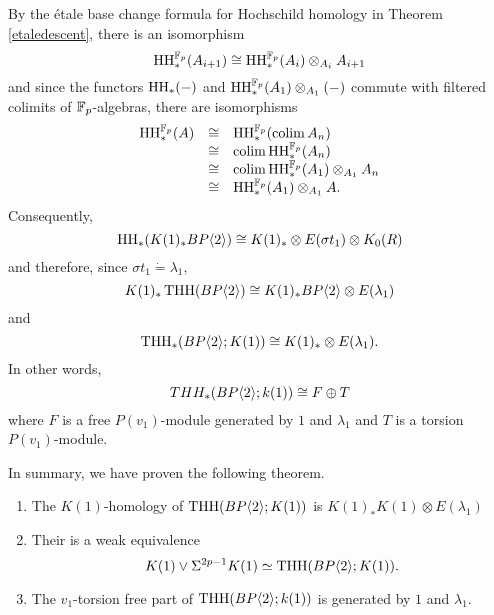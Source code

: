 By the \'etale base change formula for Hochschild homology in Theorem \ref{etaledescent}, there is an isomorphism 
\[ \operatorname{HH}_*^{\mathbb{F}_p}(A_{i+1})\cong \operatorname{HH}_*^{\mathbb{F}_p}(A_i)\otimes_{A_i}A_{i+1}\]
and since the functors $\operatorname{HH}_*(-)$ and $ \operatorname{HH}_*^{\mathbb{F}_p}(A_1)\otimes_{A_1}(-)$ commute with filtered colimits of $\mathbb{F}_p$-algebras, there are isomorphisms 
	\[ 
	\begin{array}{rcl} 
		\operatorname{HH}_*^{\mathbb{F}_p}(A) & \cong &\operatorname{HH}_*^{\mathbb{F}_p}(\operatorname*{colim} A_n) \\
				         & \cong & \operatorname*{colim}  \operatorname{HH}_*^{\mathbb{F}_p}(A_n) \\
				         & \cong & \operatorname*{colim} \operatorname{HH}_*^{\mathbb{F}_p}(A_1)\otimes_{A_1}A_n \\
				         & \cong & \operatorname{HH}_*^{\mathbb{F}_p}(A_1)\otimes_{A_1}A. \\
	\end{array}
	\]
Consequently,
\[ \operatorname{HH}_*(K(1)_*BP\langle 2 \rangle)\cong K(1)_*\otimes E(\sigma t_1)\otimes K_0(R) \]
and therefore, since $\sigma t_1\dot{=}\lambda_1$, 
\[ K(1)_*\operatorname{THH}(BP\langle 2 \rangle)\cong K(1)_*BP\langle 2 \rangle\otimes E(\lambda_1) \]
and 
\[ \operatorname{THH}_*(BP\langle 2 \rangle;K(1))\cong K(1)_*\otimes E(\lambda_1). \]
In other words, 
\[ THH_*(BP\langle 2 \rangle;k(1)) \cong F\oplus T\]
where $F$ is a free $P(v_1)$-module generated by $1$ and $\lambda_1$ and $T$ is a torsion $P(v_1)$-module. 
\begin{comment}	
We therefore have the input needed to compute the Eilenberg-Moore spectral sequence,
\[
\Tor^{K(1)_*R}(K(1)_*K(1), K(1)_*\THH(R))\implies K(1)_*\THH(R;K(1))
\]
From the previous computation, the $E^2$-term is concentrated in $\Tor_0$ and is 
\[
K(1)_*K(1)\otimes E(\lambda_1).
\]		         
Thus, every class besides $1$ and $\lambda_1$ is $v_1$-torsion in $\THH_*(R;k(1))$. Since $\THH(R;K(1))$ is a $K(1)$-module, this implies that 
\[
\THH(R;K(1))\simeq K(1)\vee \Sigma^{2p-1}K(1).
\]
\end{comment}
In summary, we have proven the following theorem.
\begin{thm}\label{thm:K(1)coeff}\mbox{}
	\begin{enumerate}
		\item The $K(1)$-homology of $\operatorname{THH}(BP\langle 2 \rangle;K(1))$ is $K(1)_*K(1)\otimes E(\lambda_1)$
		\item Their is a weak equivalence
		\[ K(1)\vee \Sigma^{2p-1}K(1)\simeq \operatorname{THH}(BP\langle 2 \rangle;K(1)).\]
		\item The $v_1$-torsion free part of $\operatorname{THH}(BP\langle 2 \rangle;k(1))$ is generated by $1$ and $\lambda_1$.
	\end{enumerate}
\end{thm}
